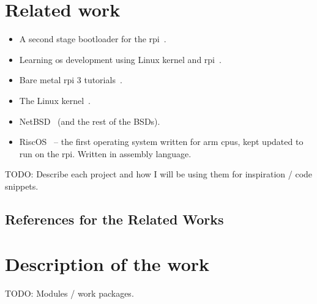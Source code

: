 \documentclass{article}
\begin{document}
\section{Related work}
\begin{refsection}

\begin{itemize}
    \item A second stage bootloader for the \gls{rpi}~\cite{rpi-boot-gh}.
    \item Learning \gls{os} development using Linux kernel and
        \gls{rpi}~\cite{raspberry-pi-os-gh}.
    \item Bare metal \gls{rpi} 3 tutorials~\cite{raspi3-tutorial-gh}.
    \item The Linux kernel~\cite{linux-kernel-git}.
    \item NetBSD~\cite{netBSD-git} (and the rest of the BSDs).
    \item RiscOS~\cite{riscOS-source} -- the first operating system written for
        \gls{arm} \glspl{cpu}, kept updated to run on the \gls{rpi}. Written in
        assembly language.
\end{itemize}

TODO: Describe each project and how I will be using them for inspiration / code
snippets.

\subsection*{References for the Related Works}
\printbibliography[heading=none]

\end{refsection}
\section{Description of the work}
TODO: Modules / work packages.

\end{document}
